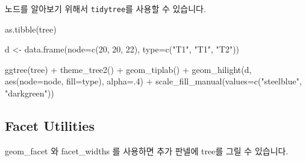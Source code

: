 \documentclass[
]{book}
\newenvironment{Shaded}{\begin{snugshade}}{\end{snugshade}}
\newcommand{\AttributeTok}[1]{\textcolor[rgb]{0.77,0.63,0.00}{#1}}
\newcommand{\DecValTok}[1]{\textcolor[rgb]{0.00,0.00,0.81}{#1}}
\newcommand{\FunctionTok}[1]{\textcolor[rgb]{0.00,0.00,0.00}{#1}}
\newcommand{\NormalTok}[1]{#1}
\newcommand{\OtherTok}[1]{\textcolor[rgb]{0.56,0.35,0.01}{#1}}
\newcommand{\SpecialCharTok}[1]{\textcolor[rgb]{0.00,0.00,0.00}{#1}}
\newcommand{\StringTok}[1]{\textcolor[rgb]{0.31,0.60,0.02}{#1}}
\begin{document}
노드를 알아보기 위해서 \texttt{tidytree}를 사용할 수 있습니다.

\begin{Shaded}
\begin{Highlighting}[]
\FunctionTok{as.tibble}\NormalTok{(tree)}

\NormalTok{d }\OtherTok{\textless{}{-}} \FunctionTok{data.frame}\NormalTok{(}\AttributeTok{node=}\FunctionTok{c}\NormalTok{(}\DecValTok{20}\NormalTok{, }\DecValTok{20}\NormalTok{, }\DecValTok{22}\NormalTok{), }\AttributeTok{type=}\FunctionTok{c}\NormalTok{(}\StringTok{"T1"}\NormalTok{, }\StringTok{"T1"}\NormalTok{, }\StringTok{"T2"}\NormalTok{))}

\FunctionTok{ggtree}\NormalTok{(tree) }\SpecialCharTok{+}
  \FunctionTok{theme\_tree2}\NormalTok{() }\SpecialCharTok{+}
  \FunctionTok{geom\_tiplab}\NormalTok{() }\SpecialCharTok{+}
  \FunctionTok{geom\_hilight}\NormalTok{(d, }\FunctionTok{aes}\NormalTok{(}\AttributeTok{node=}\NormalTok{node, }\AttributeTok{fill=}\NormalTok{type), }\AttributeTok{alpha=}\NormalTok{.}\DecValTok{4}\NormalTok{) }\SpecialCharTok{+}
  \FunctionTok{scale\_fill\_manual}\NormalTok{(}\AttributeTok{values=}\FunctionTok{c}\NormalTok{(}\StringTok{"steelblue"}\NormalTok{, }\StringTok{"darkgreen"}\NormalTok{))}
\end{Highlighting}
\end{Shaded}

\hypertarget{facet-utilities}{%
\subsection{Facet Utilities}\label{facet-utilities}}

geom\_facet 와 facet\_widths 를 사용하면 추가 판넬에 tree를 그릴 수 있습니다.
\end{document}
